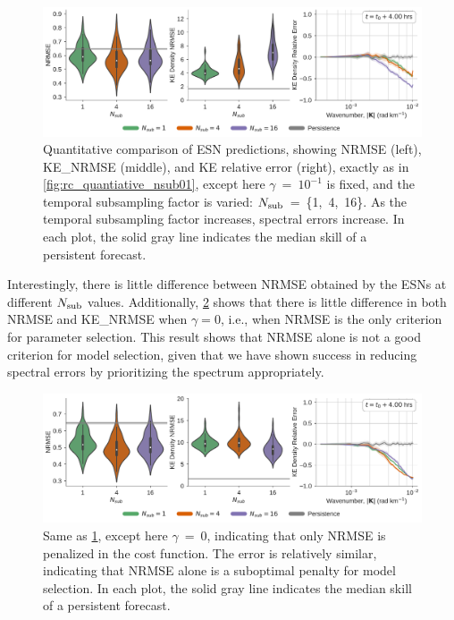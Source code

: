 \documentclass[draft]{agujournal2019}
\begin{document}
\begin{figure}
    \centering
    \includegraphics[width=\textwidth]{figures/rc_all_gamma0.1.pdf}
    \caption{Quantitative comparison of ESN predictions, showing
        NRMSE (left), KE\_NRMSE (middle), and KE relative error (right), exactly as in
        \cref{fig:rc_quantiative_nsub01}, except here $\gamma$~=~$10^{-1}$ is fixed,
        and the temporal subsampling factor is varied: $N_\text{sub}$~=~\{1,~4,~16\}.
        As the temporal subsampling factor increases, spectral errors increase.
        In each plot, the solid gray line indicates the median skill of a persistent
        forecast.
    }
    \label{fig:rc_quantiative_gamma0.1}
\end{figure}

Interestingly, there is little difference between NRMSE obtained by the ESNs at
different $N_\text{sub}$ values.
Additionally, \cref{fig:rc_quantiative_gamma0.0} shows that there is little
difference in both NRMSE and KE\_NRMSE when $\gamma=0$, i.e., when NRMSE is the only criterion
for parameter selection.
This result shows that NRMSE alone is not a good criterion for model selection, given
that we have shown success in reducing spectral errors by prioritizing the spectrum appropriately.

\begin{figure}
    \centering
    \includegraphics[width=\textwidth]{figures/rc_all_gamma0.0.pdf}
    \caption{Same as \cref{fig:rc_quantiative_gamma0.1}, except here $\gamma$~=~0,
        indicating that only NRMSE is penalized in the cost function.
        The error is relatively similar, indicating that NRMSE alone is a
        suboptimal penalty for model selection.
        In each plot, the solid gray line indicates the median skill of a persistent
        forecast.
    }
    \label{fig:rc_quantiative_gamma0.0}
\end{figure}
\end{document}
